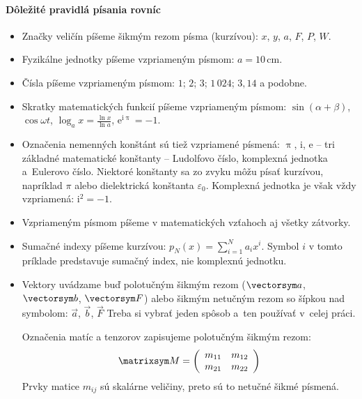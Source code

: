 \paragraph{Dôležité pravidlá písania rovníc}
\begin{itemize}

    \item Značky veličín píšeme šikmým rezom písma (kurzívou): 
    $x$, $y$, $a$, $F$, $P$, $W$.

    \item Fyzikálne jednotky píšeme vzpriameným písmom:
    $a = 10\,\mathrm{cm}$.

    \item Čísla píšeme vzpriameným písmom:
    $1$; $2$; $3$; $1\,024$; $3{,}14$ a podobne.

    \item Skratky matematických funkcií píšeme vzpriameným 
    písmom: $\sin(\alpha + \beta)$, $\cos\omega t$,
    $\log_a x = \frac{\ln x}{\ln a}$, $\mathrm{e^{i\uppi}}=-1$.

    \item Označenia nemenných konštánt sú tiež vzpriamené 
    písmená: $\uppi$, $\mathrm i$, $\mathrm e$ --
    tri základné matematické konštanty --
    Ludolfovo číslo, komplexná jednotka a~Eulerovo číslo. 
    Niektoré konštanty sa zo zvyku môžu písať kurzívou,
    napríklad $\pi$ alebo dielektrická konštanta $\varepsilon_0$. 
    Komplexná jednotka je však vždy vzpriamená:
    $\mathrm i^2 = -1$.

    \item Vzpriameným písmom píšeme v matematických vzťahoch
    aj všetky zátvorky.

    \item Sumačné indexy píšeme kurzívou:
    $p_N(x) = \sum_{i=1}^N a_ix^i$.
    Symbol $i$ v tomto príklade predstavuje sumačný index,
    nie komplexnú jednotku.

    \item Vektory uvádzame buď polotučným šikmým rezom
    ($\vectorsym a$, $\vectorsym b$, $\vectorsym F$)
    alebo šikmým netučným rezom so šípkou nad symbolom:
    $\vec a$, $\vec b$, $\vec F$
    Treba si vybrať jeden spôsob a~ten používať v~celej práci. 

    Označenia matíc a tenzorov zapisujeme polotučným šikmým rezom:
    $$\matrixsym M = \left( \begin{array}{cc}
                            m_{11} & m_{12}\\
                            m_{21} & m_{22}
                        \end{array}\right)
    $$
    Prvky matice $m_{ij}$ sú skalárne veličiny, preto sú to 
    netučné šikmé písmená.


\end{itemize}

